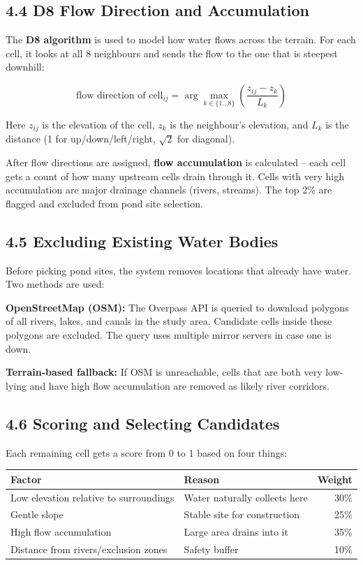 \documentclass[12pt,a4paper]{article}
\begin{document}
\subsection*{4.4 D8 Flow Direction and Accumulation}

The \textbf{D8 algorithm} is used to model how water flows across the terrain.
For each cell, it looks at all 8 neighbours and sends the flow to the one
that is steepest downhill:

\[
\text{flow direction of cell}_{ij} = \arg\max_{k \in \{1 \ldots 8\}}
\left( \frac{z_{ij} - z_k}{L_k} \right)
\]

Here $z_{ij}$ is the elevation of the cell, $z_k$ is the neighbour's
elevation, and $L_k$ is the distance (1 for up/down/left/right, $\sqrt{2}$
for diagonal).

After flow directions are assigned, \textbf{flow accumulation} is calculated --
each cell gets a count of how many upstream cells drain through it. Cells
with very high accumulation are major drainage channels (rivers, streams).
The top 2\% are flagged and excluded from pond site selection.

\subsection*{4.5 Excluding Existing Water Bodies}

Before picking pond sites, the system removes locations that already have
water. Two methods are used:

\textbf{OpenStreetMap (OSM):} The Overpass API is queried to download polygons
of all rivers, lakes, and canals in the study area. Candidate cells inside
these polygons are excluded. The query uses multiple mirror servers in case
one is down.

\textbf{Terrain-based fallback:} If OSM is unreachable, cells that are both
very low-lying and have high flow accumulation are removed as likely river
corridors.

\subsection*{4.6 Scoring and Selecting Candidates}

Each remaining cell gets a score from 0 to 1 based on four things:

\begin{center}
\begin{tabular}{llr}
\toprule
Factor & Reason & Weight \\
\midrule
Low elevation relative to surroundings & Water naturally collects here & 30\% \\
Gentle slope                           & Stable site for construction  & 25\% \\
High flow accumulation                 & Large area drains into it     & 35\% \\
Distance from rivers/exclusion zones   & Safety buffer                 & 10\% \\
\bottomrule
\end{tabular}
\end{center}
\end{document}
